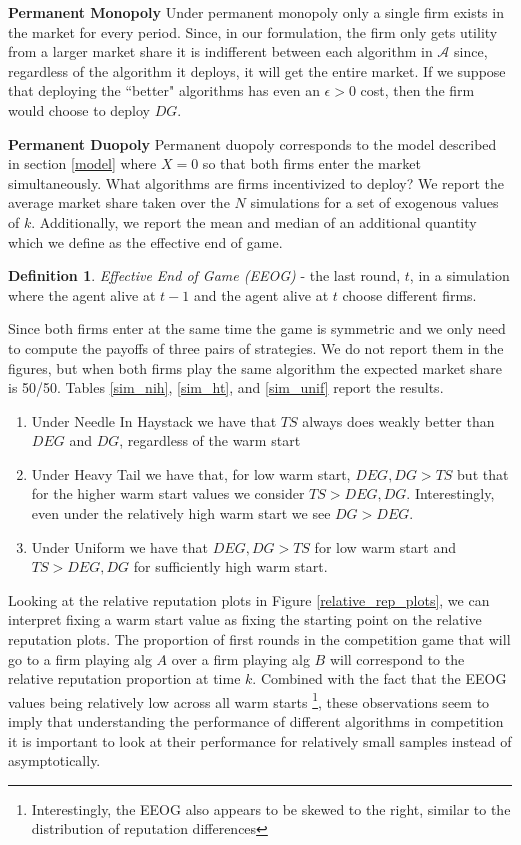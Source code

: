 \documentclass{article}
\theoremstyle{definition}
\newtheorem{definition}{Definition}
\begin{document}
\textbf{Permanent Monopoly} Under permanent monopoly only a single firm exists in the market for every period. Since, in our formulation, the firm only gets utility from a larger market share it is indifferent between each algorithm in $\mathcal{A}$ since, regardless of the algorithm it deploys, it will get the entire market. If we suppose that deploying the ``better" algorithms has even an $\epsilon > 0$ cost, then the firm would choose to deploy $DG$.

\textbf{Permanent Duopoly} Permanent duopoly corresponds to the model described in section \ref{model} where $X = 0$ so that both firms enter the market simultaneously. What algorithms are firms incentivized to deploy? We report the average market share taken over the $N$ simulations for a set of exogenous values of $k$. Additionally, we report the mean and median of an additional quantity which we define as the effective end of game.

\begin{definition}
\textit{Effective End of Game (EEOG)} - the last round, $t$, in a simulation where the agent alive at $t-1$ and the agent alive at $t$ choose different firms.
\end{definition}

Since both firms enter at the same time the game is symmetric and we only need to compute the payoffs of three pairs of strategies. We do not report them in the figures, but when both firms play the same algorithm the expected market share is 50/50. Tables \ref{sim_nih}, \ref{sim_ht}, and \ref{sim_unif} report the results.
\begin{enumerate}
\item Under Needle In Haystack we have that $TS$ always does weakly better than $DEG$ and $DG$, regardless of the warm start
\item Under Heavy Tail we have that, for low warm start, $DEG, DG > TS$ but that for the higher warm start values we consider $TS > DEG, DG$. Interestingly, even under the relatively high warm start we see $DG > DEG$.
\item Under Uniform we have that $DEG, DG > TS$ for low warm start and $TS > DEG, DG$ for sufficiently high warm start.
\end{enumerate}

Looking at the relative reputation plots in Figure \ref{relative_rep_plots}, we can interpret fixing a warm start value as fixing the starting point on the relative reputation plots. The proportion of first rounds in the competition game that will go to a firm playing alg $A$ over a firm playing alg $B$ will correspond to the relative reputation proportion at time $k$. Combined with the fact that the EEOG values being relatively low across all warm starts \footnote{Interestingly, the EEOG also appears to be skewed to the right, similar to the distribution of reputation differences}, these observations seem to imply that understanding the performance of different algorithms in competition it is important to look at their performance for relatively small samples instead of asymptotically.
\end{document}
